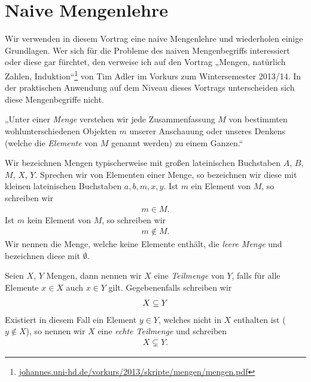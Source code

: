 \section{Naive Mengenlehre}
\label{sec:mengen}

Wir verwenden in diesem Vortrag eine naive Mengenlehre und wiederholen
einige Grundlagen. Wer sich für die Probleme des naiven Mengenbegriffs
interessiert oder diese gar fürchtet, den verweise ich auf den Vortrag
„Mengen, natürlich Zahlen,
Induktion“\footnote{\href{http://johannes.uni-hd.de/vorkurs/2013/skripte/mengen/mengen.pdf}{johannes.uni-hd.de/vorkurs/2013/skripte/mengen/mengen.pdf}}
von Tim Adler im Vorkurs zum Wintersemester 2013/14. In der praktischen
Anwendung auf dem Niveau dieses Vortrags unterscheiden sich diese
Mengenbegriffe nicht.

\begin{definn}

  „Unter einer \emph{Menge} verstehen wir jede Zusammenfassung $M$ von
  bestimmten wohlunterschiedenen Objekten $m$ unserer Anschauung oder
  unseres Denkens (welche die \emph{Elemente} von $M$ genannt werden) zu
  einem Ganzen.“ 

\end{definn}


Wir bezeichnen Mengen typischerweise mit großen lateinischen Buchstaben
$A$, $B$, $M$, $X$, $Y$. Sprechen wir von Elementen einer Menge, so
bezeichnen wir diese mit kleinen lateinischen Buchstaben $a,b,m,x,y$. Ist
$m$ ein Element von $M$, so schreiben wir
\begin{align*}
  m \in M.
\end{align*}
Ist $m$ kein Element von $M$, so schreiben wir
\begin{align*}
  m \notin M.
\end{align*}
Wir nennen die Menge, welche keine Elemente enthält, die
\emph{leere Menge} und bezeichnen diese mit $\emptyset$.


\begin{definn}

  Seien $X$, $Y$ Mengen, dann nennen wir $X$ eine \emph{Teilmenge} von $Y$,
  falls für alle Elemente $x \in X$ auch $x \in Y$ gilt. Gegebenenfalls
  schreiben wir
  \begin{align*}
    X \sbeq Y %
  \end{align*}
  Existiert in diesem Fall ein Element $y\in Y$, welches nicht in $X$
  enthalten ist ($y\notin X$), so nennen wir $X$ eine \emph{echte
    Teilmenge} und schreiben
  \begin{align*}
    X \subsetneq Y.
  \end{align*}

\end{definn}

